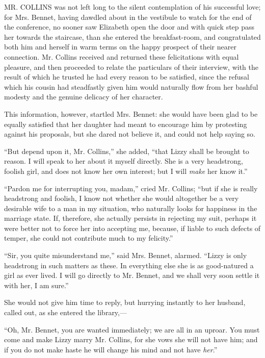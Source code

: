 \documentclass[12pt,openright]{book}
\begin{document}
\noindent  MR. COLLINS was not left long to the silent contemplation of his successful love; for Mrs. Bennet, having dawdled about in the vestibule to watch for the end of the conference, no sooner saw Elizabeth open the door and with quick step pass her towards the staircase, than she entered the breakfast-room, and congratulated both him and herself in warm terms on the happy prospect of their nearer connection. Mr. Collins received and returned these felicitations with equal pleasure, and then proceeded to relate the particulars of their interview, with the result of which he trusted he had every reason to be satisfied, since the refusal which his cousin had steadfastly given him would naturally flow from her bashful modesty and the genuine delicacy of her character.

This information, however, startled Mrs. Bennet: she would have been glad to be equally satisfied that her daughter had meant to encourage him by protesting against his proposals, but she dared not believe it, and could not help saying so.

“But depend upon it, Mr. Collins,” she added, “that Lizzy shall be brought to reason. I will speak to her about it myself directly. She is a very headstrong, foolish girl, and does not know her own interest; but I will \textit{make} her know it.”

“Pardon me for interrupting you, madam,” cried Mr. Collins; “but if she is really headstrong and foolish, I know not whether she would altogether be a very desirable wife to a man in my situation, who naturally looks for happiness in the marriage state. If, therefore, she actually persists in rejecting my suit, perhaps it were better not to force her into accepting me, because, if liable to such defects of temper, she could not contribute much to my felicity.”

“Sir, you quite misunderstand me,” said Mrs. Bennet, alarmed. “Lizzy is only headstrong in such matters as these. In everything else she is as good-natured a girl as ever lived. I will go directly to Mr. Bennet, and we shall very soon settle it with her, I am sure.”

She would not give him time to reply, but hurrying instantly to her husband, called out, as she entered the library,—

“Oh, Mr. Bennet, you are wanted immediately; we are all in an uproar. You must come and make Lizzy marry Mr. Collins, for she vows she will not have him; and if you do not make haste he will change his mind and not have \textit{her}.”
\end{document}
